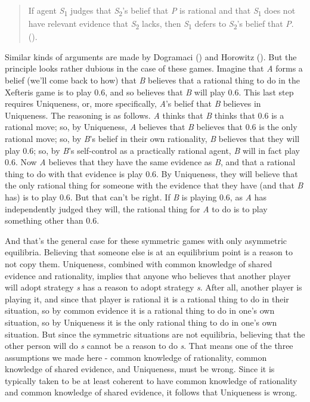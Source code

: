 \documentclass[
  10pt,
  letterpaper,
  DIV=11,
  numbers=noendperiod,
  twoside]{scrartcl}
\begin{document}
\begin{quote}
If agent \emph{S}\textsubscript{1} judges that
\emph{S}\textsubscript{2}'s belief that \emph{P} is rational and that
\emph{S}\textsubscript{1} does not have relevant evidence that
\emph{S}\textsubscript{2} lacks, then \emph{S}\textsubscript{1} defers
to \emph{S}\textsubscript{2}'s belief that \emph{P}.
().
\end{quote}

Similar kinds of arguments are made by Dogramaci
() and Horowitz
(). But the principle looks rather
dubious in the case of these games. Imagine that \emph{A} forms a belief
(we'll come back to how) that \emph{B} believes that a rational thing to
do in the Xefteris game is to play 0.6, and so believes that \emph{B}
will play 0.6. This last step requires Uniqueness, or, more
specifically, \emph{A}'s belief that \emph{B} believes in Uniqueness.
The reasoning is as follows. \emph{A} thinks that \emph{B} thinks that
0.6 is a rational move; so, by Uniqueness, \emph{A} believes that
\emph{B} believes that 0.6 is the only rational move; so, by \emph{B}'s
belief in their own rationality, \emph{B} believes that they will play
0.6; so, by \emph{B}'s self-control as a practically rational agent,
\emph{B} will in fact play 0.6. Now \emph{A} believes that they have the
same evidence as \emph{B}, and that a rational thing to do with that
evidence is play 0.6. By Uniqueness, they will believe that the only
rational thing for someone with the evidence that they have (and that
\emph{B} has) is to play 0.6. But that can't be right. If \emph{B} is
playing 0.6, as \emph{A} has independently judged they will, the
rational thing for \emph{A} to do is to play something other than 0.6.

And that's the general case for these symmetric games with only
asymmetric equilibria. Believing that someone else is at an equilibrium
point is a reason to not copy them. Uniqueness, combined with common
knowledge of shared evidence and rationality, implies that anyone who
believes that another player will adopt strategy \emph{s} has a reason
to adopt strategy \emph{s}. After all, another player is playing it, and
since that player is rational it is a rational thing to do in their
situation, so by common evidence it is a rational thing to do in one's
own situation, so by Uniqueness it is the only rational thing to do in
one's own situation. But since the symmetric situations are not
equilibria, believing that the other person will do \emph{s} cannot be a
reason to do \emph{s}. That means one of the three assumptions we made
here - common knowledge of rationality, common knowledge of shared
evidence, and Uniqueness, must be wrong. Since it is typically taken to
be at least coherent to have common knowledge of rationality and common
knowledge of shared evidence, it follows that Uniqueness is wrong.
\end{document}
